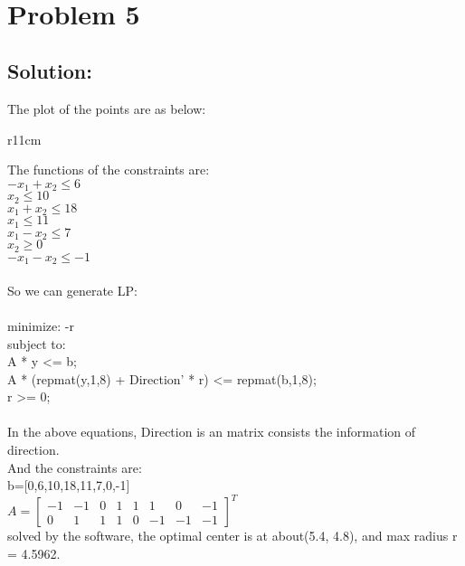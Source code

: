 \documentclass{article}
\begin{document}
{{\newpage ~\\ 
\section*{Problem 5}
\subsection*{Solution:}
The plot of the points are as below:\\
\begin{wrapfigure}{r}{11cm}
\end{wrapfigure}
The functions of the constraints are:\\
$-x_1+x_2\leq 6$\\ $x_2\leq 10$\\$x_1+x_2\leq 18$\\$x_1\leq 11$\\$x_1-x_2 \leq 7$\\$x_2 \geq 0$\\$-x_1-x_2\leq -1$\\
~\\
So we can generate LP:\\
~\\
minimize: -r\\ 
subject to:\\
\quad A * y <= b;\\
\quad A * (repmat(y,1,8) + Direction' * r) <= repmat(b,1,8);\\
\quad r >= 0;\\ 
~\\
In the above equations, Direction is an matrix consists the information of direction.\\ 
And the constraints are:\\ 
b=[0,6,10,18,11,7,0,-1]\\
$A = \begin{bmatrix}
  -1&-1&0&1&1&1&0&-1\\0&1&1&1&0&-1&-1&-1
\end{bmatrix}^T$\\ 
solved by the software, the optimal center is at about(5.4, 4.8), and max radius r = 4.5962.\\ 
\newpage
~\\
}}
\end{document}
